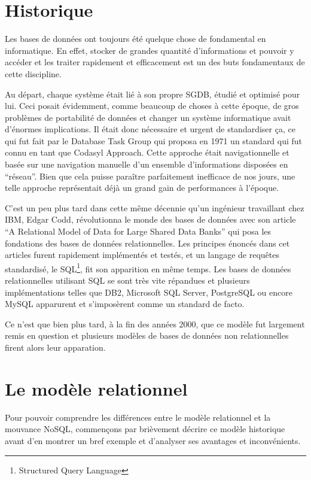 \documentclass[11pt]{article}
\begin{document}
\section{Historique}
Les bases de données ont toujours été quelque chose de fondamental en informatique. En effet, stocker de grandes quantité d'informations et pouvoir y accéder et les traiter rapidement et efficacement est un des buts fondamentaux de cette discipline.

Au départ, chaque système était lié à son propre SGDB, étudié et optimisé pour lui. Ceci posait évidemment, comme beaucoup de choses à cette époque, de gros problèmes de portabilité de données et changer un système informatique avait d'énormes implications. Il était donc nécessaire et urgent de standardiser ça, ce qui fut fait par le Database Task Group qui proposa en 1971 un standard qui fut connu en tant que Codasyl Approach. Cette approche était navigationnelle et basée sur une navigation manuelle d'un ensemble d'informations disposées en ``réseau''. Bien que cela puisse paraître parfaitement inefficace de nos jours, une telle approche représentait déjà un grand gain de performances à l'époque.

C'est un peu plus tard dans cette même décennie qu'un ingénieur travaillant chez IBM, Edgar Codd, révolutionna le monde des bases de données avec son article ``A Relational Model of Data for Large Shared Data Banks'' qui posa les fondations des bases de données relationnelles. Les principes énoncés dans cet articles furent rapidement implémentés et testés, et un langage de requêtes standardisé, le SQL\footnote{Structured Query Language}, fit son apparition en même temps. Les bases de données relationnelles utilisant SQL se sont très vite répandues et plusieurs implémentations telles que DB2, Microsoft SQL Server, PostgreSQL ou encore MySQL apparurent et s'imposèrent comme un standard de facto.

Ce n'est que bien plus tard, à la fin des années 2000, que ce modèle fut largement remis en question et plusieurs modèles de bases de données non relationnelles firent alors leur apparation.

\section{Le modèle relationnel}
Pour pouvoir comprendre les différences entre le modèle relationnel et la mouvance NoSQL, commençons par brièvement décrire ce modèle historique avant d'en montrer un bref exemple et d'analyser ses avantages et inconvénients.
\end{document}
